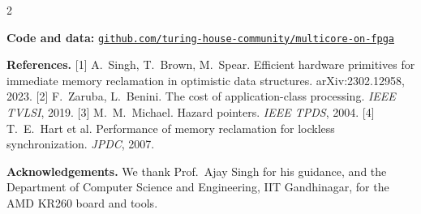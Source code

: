 \documentclass{article}
\newcommand{\smallsize}{\fontsize{14}{17}\selectfont}
\begin{document}
\begin{multicols}{2}
\vspace{3pt}
{\smallsize
\textbf{Code and data:} \href{https://github.com/turing-house-community/multicore-on-fpga}{\texttt{github.com/turing-house-community/multicore-on-fpga}}\par\vspace{2pt}
\textbf{References.}
[1] A.~Singh, T.~Brown, M.~Spear. Efficient hardware primitives for immediate memory
reclamation in optimistic data structures. arXiv:2302.12958, 2023.
[2] F.~Zaruba, L.~Benini. The cost of application-class processing. \emph{IEEE TVLSI}, 2019.
[3] M.~M.~Michael. Hazard pointers. \emph{IEEE TPDS}, 2004.
[4] T.~E.~Hart et al. Performance of memory reclamation for lockless synchronization.
\emph{JPDC}, 2007.\par\vspace{3pt}
\textbf{Acknowledgements.} We thank Prof.\ Ajay Singh for his guidance, and the Department
of Computer Science and Engineering, IIT Gandhinagar, for the AMD KR260 board and tools.\par}

\end{multicols}
\end{document}

